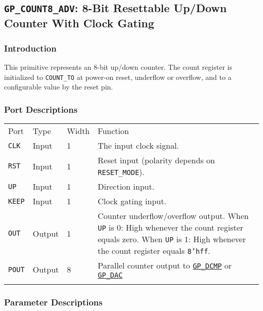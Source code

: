 \documentclass[11pt]{article}
\newcommand{\tokenstyle}[1]{\texttt{#1}}
\newcommand{\datastyle}[1]{\texttt{#1}}
\newcommand{\whenstyle}[1]{{\fontseries{sb}\selectfont#1}}
\newcommand{\tokenref}[2]{\hyperref[#2]{\tokenstyle{#1}}}
\newcommand{\thinhline}{\Xhline{1\arrayrulewidth}}
\newcommand{\thickhline}{\Xhline{2.5\arrayrulewidth}}
\begin{document}
\pagebreak
\subsection{\tokenstyle{GP\_COUNT8\_ADV}: 8-Bit Resettable Up/Down Counter With Clock Gating}
\label{gp-count8-adv}

\subsubsection{Introduction}
This primitive represents an 8-bit up/down counter. The count register is initialized to \tokenstyle{COUNT\_TO} at
power-on reset, underflow or overflow, and to a configurable value by the reset pin.

\subsubsection{Port Descriptions}

\begin{tabularx}{\textwidth}{lllX}
\thinhline
\whenstyle{Port} & \whenstyle{Type} & \whenstyle{Width} & \whenstyle{Function} \\
\thickhline
\tokenstyle{CLK} & Input & 1 & The input clock signal. \\
\thinhline
\tokenstyle{RST} & Input & 1 & Reset input (polarity depends on \tokenstyle{RESET\_MODE}). \\
\thinhline
\tokenstyle{UP} & Input & 1 & Direction input. \\
\thinhline
\tokenstyle{KEEP} & Input & 1 & Clock gating input. \\
\thinhline
\tokenstyle{OUT} & Output & 1 & Counter underflow/overflow output. \newline
	\whenstyle{When \tokenstyle{UP} is 0:} High whenever the count register equals zero. \newline
	\whenstyle{When \tokenstyle{UP} is 1:} High whenever the count register equals \datastyle{8'hff}. \\
\thinhline
\tokenstyle{POUT} & Output & 8 & Parallel counter output to \tokenref{GP\_DCMP}{gp-dcmp} or \tokenref{GP\_DAC}{gp-dac} \\
\thinhline
\end{tabularx}

\subsubsection{Parameter Descriptions}
\end{document}
